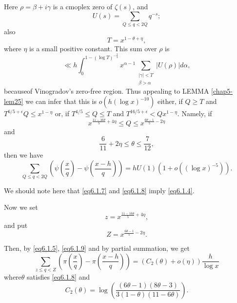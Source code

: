 Here $\rho = \beta + i \gamma $ is a cmoplex zero of $\zeta (s)$, and 
$$
U (s) = \sum_{Q \leq q < 2Q} q^{-s};
$$
also
\begin{equation*}
  T= x^{1 -\theta + \eta}, \tag{6.1.6}\label{eq6.1.6}
\end{equation*}   
where $\eta$ is a small positive constant. This sum over $\rho $ is
$$
\ll h \int_{0}^{1- ( \log T ) ^{-\frac{3}{4}}} x^{\alpha -1}
\sum_{\substack{ | \gamma | < T \\ \beta > \alpha}}  | U (\rho ) |
d \alpha,  
$$
because\pageoriginale of Vinogradov's zero-free region. Thus appealing
to LEMMA \ref{chap5-lem25} 
we can infer that this is $o (h (\log x)^{-10})$ either, if $Q \geq
T$ and $T^{6/5 + \epsilon} Q \leq x^{1-\eta}$ or, if $T^{4/5} \leq Q
\leq T$ and $T^{16/5 + \epsilon } < Qx^{1-\eta}$. Namely, if  
\begin{equation*}
x^{\frac{11 - 16\theta}{5} +  4 \eta}  \leq Q \leq x ^{\frac {6\theta
    -1}{5}- 2 \eta} \tag{6.1.7}\label{eq6.1.7} 
\end{equation*}   
and 
\begin{equation*}
\frac{6}{11} + 2 \eta \leq \theta \leq \frac{7}{12},
\tag{6.1.8}\label{eq6.1.8} 
\end{equation*}   
then we have
\begin{equation*}
  \sum_{Q \leq q < 2Q} \left(\psi \left(\frac{x}{q}\right) - \psi
  \left(\frac{x-h}{q}\right)\right) = h
  U (1) (1+o((\log x)^{-5})). \tag{6.1.9}\label{eq6.1.9} 
\end{equation*}

We should note here that \eqref{eq6.1.7} and \eqref{eq6.1.8} imply
\eqref{eq6.1.4}.  
 
Now we set
\begin{equation*}
z=x ^{\frac{11-16 \theta}{5} + 4 \eta}, \tag{6.1.10}\label{eq6.1.10}
 \end{equation*} 
 and put
 \begin{equation*}
 Z = x^{\frac{6 \theta - 1}{5} - 2 \eta}. \tag{6.1.11}\label{eq6.1.11}
 \end{equation*} 

 Then, by \eqref{eq6.1.5}, \eqref{eq6.1.9} and by partial summation, we get
 $$
  \sum_{z \leq q < Z} \left(\pi \left(\frac{x}{q}\right) - \pi \left(
  \frac{x-h}{q}\right)\right) =  (C_2 ( \theta ) + o (\eta)) \frac{h}{\log x} 
 $$
 where\pageoriginale $\theta$ satisfies \eqref{eq6.1.8} and
 $$
 C_2(\theta) = \log \left(\frac{(6\theta -1 ) ( 8 \theta
   -3)}{3(1-\theta)(11 - 6 \theta)}\right). 
 $$

